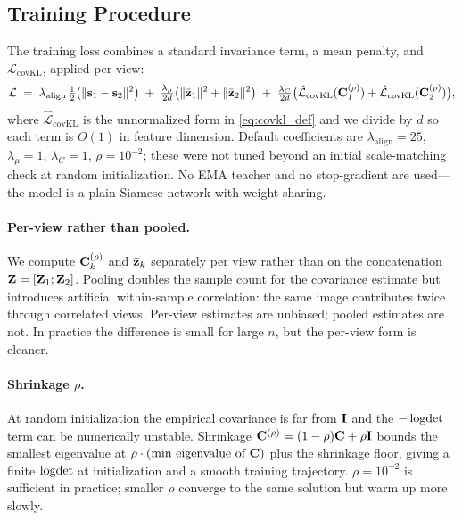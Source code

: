 \subsection{Training Procedure}

The training loss combines a standard invariance term, a mean penalty, and $\mathcal{L}_\text{covKL}$, applied per view:
\begin{equation}
\label{eq:loss}
    \mathcal{L} \;=\; \lambda_\text{align}\,\tfrac{1}{2}\bigl(\|\mathbf{s}_1 - \mathbf{s}_2\|^2\bigr) \;+\; \tfrac{\lambda_\mu}{2 d}\bigl(\|\bar{\mathbf{z}}_1\|^2 + \|\bar{\mathbf{z}}_2\|^2\bigr) \;+\; \tfrac{\lambda_C}{2 d}\bigl(\hat{\mathcal{L}}_\text{covKL}(\mathbf{C}_1^{(\rho)}) + \hat{\mathcal{L}}_\text{covKL}(\mathbf{C}_2^{(\rho)})\bigr),
\end{equation}
where $\hat{\mathcal{L}}_\text{covKL}$ is the unnormalized form in \eqref{eq:covkl_def} and we divide by $d$ so each term is $O(1)$ in feature dimension. Default coefficients are $\lambda_\text{align} = 25$, $\lambda_\mu = 1$, $\lambda_C = 1$, $\rho = 10^{-2}$; these were not tuned beyond an initial scale-matching check at random initialization. No EMA teacher and no stop-gradient are used---the model is a plain Siamese network with weight sharing.

\paragraph{Per-view rather than pooled.}
We compute $\mathbf{C}_k^{(\rho)}$ and $\bar{\mathbf{z}}_k$ separately per view rather than on the concatenation $\mathbf{Z} = [\mathbf{Z}_1; \mathbf{Z}_2]$. Pooling doubles the sample count for the covariance estimate but introduces artificial within-sample correlation: the same image contributes twice through correlated views. Per-view estimates are unbiased; pooled estimates are not. In practice the difference is small for large $n$, but the per-view form is cleaner.

\paragraph{Shrinkage $\rho$.}
At random initialization the empirical covariance is far from $\mathbf{I}$ and the $-\operatorname{logdet}$ term can be numerically unstable. Shrinkage $\mathbf{C}^{(\rho)} = (1-\rho)\mathbf{C} + \rho\mathbf{I}$ bounds the smallest eigenvalue at $\rho\cdot(\text{min eigenvalue of } \mathbf{C})$ plus the shrinkage floor, giving a finite $\operatorname{logdet}$ at initialization and a smooth training trajectory. $\rho = 10^{-2}$ is sufficient in practice; smaller $\rho$ converge to the same solution but warm up more slowly.


